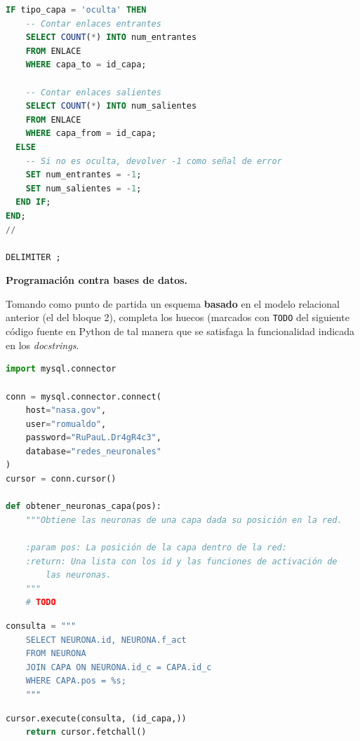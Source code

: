 \documentclass[
    12pt,
    a4paper,
    addpoints,
    answers,
    convocatoria=ord,
    titulacion=CD,
    curso=2024/2025,
]{db-exam}
\begin{document}
\begin{questions}
\begin{parts}
\begin{solution}
\begin{lstlisting}[language=sql]
  IF tipo_capa = 'oculta' THEN
    -- Contar enlaces entrantes
    SELECT COUNT(*) INTO num_entrantes
    FROM ENLACE
    WHERE capa_to = id_capa;

    -- Contar enlaces salientes
    SELECT COUNT(*) INTO num_salientes
    FROM ENLACE
    WHERE capa_from = id_capa;
  ELSE
    -- Si no es oculta, devolver -1 como señal de error
    SET num_entrantes = -1;
    SET num_salientes = -1;
  END IF;
END;
//

DELIMITER ;

\end{lstlisting}

\end{solution}

\end{parts}

\newpage

\question[2] \textbf{Programación contra bases de datos.}

Tomando como punto de partida un esquema \textbf{basado} en el modelo relacional anterior (el del bloque 2), completa los huecos (marcados con \texttt{TODO} del siguiente código fuente en Python de tal manera que se satisfaga la funcionalidad indicada en los \textit{docstrings}.

\begin{lstlisting}[language=Python]
import mysql.connector

conn = mysql.connector.connect(
    host="nasa.gov",
    user="romualdo",
    password="RuPauL.Dr4gR4c3",
    database="redes_neuronales"
)
cursor = conn.cursor()

def obtener_neuronas_capa(pos):
    """Obtiene las neuronas de una capa dada su posición en la red.

    :param pos: La posición de la capa dentro de la red:
    :return: Una lista con los id y las funciones de activación de
        las neuronas.
    """
    # TODO
\end{lstlisting}

\begin{solutionorbox}
\begin{lstlisting}[language=Python]
    consulta = """
    SELECT NEURONA.id, NEURONA.f_act
    FROM NEURONA
    JOIN CAPA ON NEURONA.id_c = CAPA.id_c
    WHERE CAPA.pos = %s;
    """
\end{lstlisting}
\end{solutionorbox}

\begin{lstlisting}[language=Python]
    cursor.execute(consulta, (id_capa,))
    return cursor.fetchall()


\end{lstlisting}
\end{questions}
\end{document}
